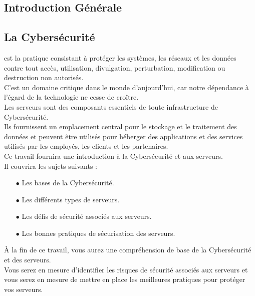 \listoffigures
\pagebreak 
\listoftables
\pagebreak
		\newpage
	   
	     
	    
	    
	    
	    
    
	\begin{Huge}
		\chapter{ Introduction Générale}
	\end{Huge}
 \paragraph{ }
\section{La Cybersécurité}
 est la pratique consistant à protéger les systèmes, les réseaux et les données contre tout accès, utilisation, divulgation, perturbation, modification ou destruction non autorisés.\\
 C'est un domaine critique dans le monde d’aujourd'hui, car notre dépendance à l'égard de la technologie ne cesse de croître.\\
Les serveurs sont des composants essentiels de toute infrastructure de Cybersécurité.\\
 Ils fournissent un emplacement central pour le stockage et le traitement des données et peuvent être utilisés pour héberger des applications et des services utilisés par les employés, les clients et les partenaires.\\
Ce travail fournira une introduction à la Cybersécurité et aux serveurs.\\
 Il couvrira les sujets suivants :
 
\begin{itemize}
	\item[$\bullet$] Les bases de la Cybersécurité.
	\item[$\bullet$] Les différents types de serveurs.
	\item[$\bullet$] Les défis de sécurité associés aux serveurs.
	\item[$\bullet$] Les bonnes pratiques de sécurisation des serveurs.
\end{itemize}

À la fin de ce travail, vous aurez une compréhension de base de la Cybersécurité et des serveurs.\\ Vous serez en mesure d'identifier les risques de sécurité associés aux serveurs et vous serez en mesure de mettre en place les meilleures pratiques pour protéger vos serveurs.
